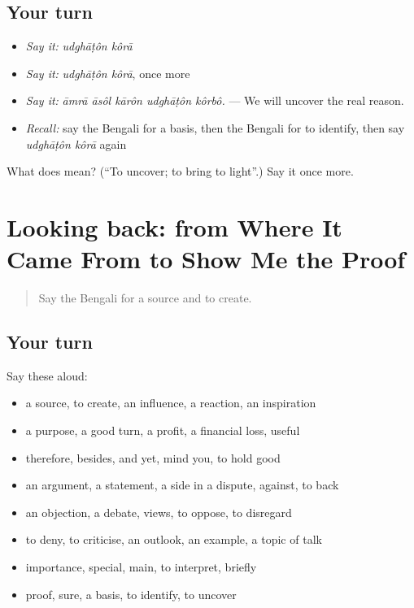 \subsection*{Your turn}
\begin{itemize}
\raggedright
  \item \emph{Say it:} \emph{udghāṭôn kôrā}
  \item \emph{Say it:} \emph{udghāṭôn kôrā}, once more
  \item \emph{Say it:} \emph{āmrā āsôl kārôn udghāṭôn kôrbô.} — We will uncover the real reason.
  \item \emph{Recall:} say the Bengali for a basis, then the Bengali for to identify, then say \emph{udghāṭôn kôrā} again
\end{itemize}

\begin{tcolorbox}[breakable,colback=teal!4,colframe=teal!35!black,title={Before you move on}]
What does   mean? (\textquotedblleft{}To uncover; to bring to light\textquotedblright{}.) Say it once more.
\end{tcolorbox}
\section[(dialogue)]{Looking back: from Where It Came From to Show Me the Proof}

\label{lesson:BN-R337-review-330-337}



\begin{quote}
Say the Bengali for a source and to create.
\end{quote}

\subsection*{Your turn}
Say these aloud:

\begin{itemize}
\raggedright
  \item a source, to create, an influence, a reaction, an inspiration
  \item a purpose, a good turn, a profit, a financial loss, useful
  \item therefore, besides, and yet, mind you, to hold good
  \item an argument, a statement, a side in a dispute, against, to back
  \item an objection, a debate, views, to oppose, to disregard
  \item to deny, to criticise, an outlook, an example, a topic of talk
  \item importance, special, main, to interpret, briefly
  \item proof, sure, a basis, to identify, to uncover
\end{itemize}

